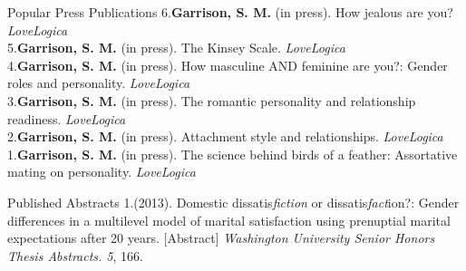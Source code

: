 \documentclass {resume}
\newcommand{\meb}{{\bf Garrison, S. M.}\xspace}
\begin{document}
\pagestyle{myheadings}
\begin{samepage}\begin{rSection}{\textrm{Popular Press Publications}}
6.\hspace* {2.5 mm}\textbf{Garrison, S. M.} (in press). How jealous are you? \textit{LoveLogica}\smallskip\\
5.\hspace* {2.5 mm}\textbf{Garrison, S. M.} (in press). The Kinsey Scale. \textit{LoveLogica}\smallskip\\
4.\hspace* {2.5 mm}\textbf{Garrison, S. M.} (in press). How masculine AND feminine are you?: Gender roles and personality. \textit{LoveLogica}\smallskip\\
3.\hspace* {2.5 mm}\textbf{Garrison, S. M.} (in press). %
The romantic personality and relationship readiness. \textit{LoveLogica}\smallskip\\
2.\hspace* {2.5 mm}\textbf{Garrison, S. M.} (in press). Attachment style and relationships. \textit{LoveLogica}\smallskip\\
1.\hspace* {2.5 mm}\textbf{Garrison, S. M.} (in press). The science behind birds of a feather: Assortative mating on personality. \textit{LoveLogica}%
\end{rSection}\end{samepage}
\begin{samepage}\begin{rSection}{\textrm{Published Abstracts}}
1.\hspace* {2.5 mm}\meb (2013). Domestic dissatis{\em fiction} or dissatis{\em fact}ion?: Gender differences in a multilevel model \hspace* {6 mm}of marital satisfaction using prenuptial marital expectations after 20 years. [Abstract] {\em Washington University \hspace* {6 mm}Senior Honors Thesis Abstracts. 5}, 166.\end{rSection}\end{samepage}\pagebreak
\end{document}
